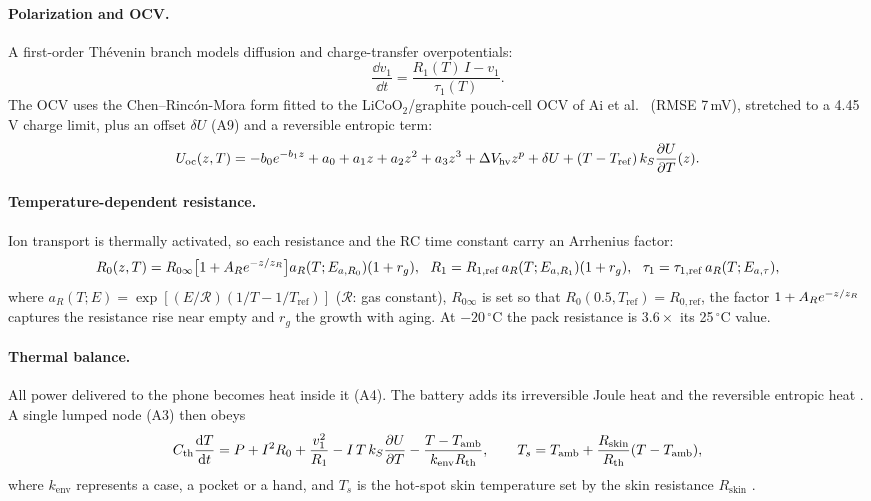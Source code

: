 \paragraph{Polarization and OCV.} A first-order Th\'evenin branch models diffusion and charge-transfer
overpotentials:
\begin{equation}
  \frac{\dd v_1}{\dd t}=\frac{R_1(T)\,I-v_1}{\tau_1(T)}. \label{eq:rc}
\end{equation}
The OCV uses the Chen--Rinc\'on-Mora form \cite{CRM06} fitted to the LiCoO$_2$/graphite pouch-cell OCV of Ai et
al.\ \cite{AI20} (RMSE 7\,mV), stretched to a 4.45\,V charge limit, plus an offset $\delta U$ (A9) and a
reversible entropic term:
\begin{equation}
  U_{\mathrm{oc}}(z,T)=-b_0e^{-b_1z}+a_0+a_1z+a_2z^2+a_3z^3+\Delta V_{\mathrm{hv}}z^{p}+\delta U+(T-T_{\mathrm{ref}})\,k_S\frac{\partial U}{\partial T}(z). \label{eq:ocv}
\end{equation}

\paragraph{Temperature-dependent resistance.} Ion transport is thermally activated, so each resistance and the
RC time constant carry an Arrhenius factor:
\begin{equation}
  R_0(\soc,T)=R_{0\infty}\big[1+A_Re^{-\soc/\soc_R}\big]a_R(T;E_{a,R_0})(1+r_g),\ \
  R_1=R_{1,\mathrm{ref}}\,a_R(T;E_{a,R_1})(1+r_g),\ \ \tau_1=\tau_{1,\mathrm{ref}}\,a_R(T;E_{a,\tau}), \label{eq:resist}
\end{equation}
where $a_R(T;E)=\exp[(E/\mathcal R)(1/T-1/T_{\mathrm{ref}})]$ ($\mathcal R$: gas constant), $R_{0\infty}$ is set so
that $R_0(0.5,T_{\mathrm{ref}})=R_{0,\mathrm{ref}}$, the factor $1+A_Re^{-z/z_R}$ captures the resistance rise
near empty and $r_g$ the growth with aging.
At $-20\,^\circ$C the pack resistance is $3.6\times$ its 25\,$^\circ$C value.

\paragraph{Thermal balance.} All power delivered to the phone becomes heat inside it (A4). The battery adds its
irreversible Joule heat and the reversible entropic heat \cite{BERN85}. A single lumped node (A3) then obeys
\begin{equation}
  C_{\mathrm{th}}\frac{\mathrm{d} T}{\mathrm{d} t}=P+I^2R_0+\frac{v_1^2}{R_1}-I\,T\,k_S\frac{\partial U}{\partial T}-\frac{T-T_{\mathrm{amb}}}{k_{\mathrm{env}}R_{\mathrm{th}}},
  \qquad T_s=T_{\mathrm{amb}}+\frac{R_{\mathrm{skin}}}{R_{\mathrm{th}}}(T-T_{\mathrm{amb}}), \label{eq:thermal}
\end{equation}
where $k_{\mathrm{env}}$ represents a case, a pocket or a hand, and $T_s$ is the hot-spot skin temperature set by
the skin resistance $R_{\mathrm{skin}}$ \cite{KANG19,PU23}.

